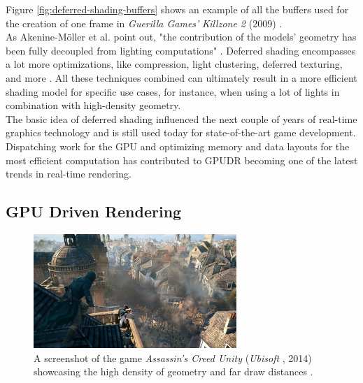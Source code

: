 \noindent
Figure \ref{fig:deferred-shading-buffers} shows an example of all the buffers used for the creation of one frame in 
\emph{Guerilla Games'} \emph{Killzone 2} (2009) \cite{KillzoneFandom}. \\

\noindent
As Akenine-Möller et al. point out, "the contribution of the models' geometry has been fully decoupled from lighting 
computations" \cite{AkenineMoeller2018}. Deferred shading encompasses a lot more optimizations, like compression, 
light clustering, deferred texturing, and more \cite{AkenineMoeller2018}. All these techniques combined can ultimately 
result in a more efficient shading model for specific use cases, for instance, when using a lot of lights in combination 
with high-density geometry. \\

\noindent
The basic idea of deferred shading influenced the next couple of years of real-time graphics technology and is 
still used today for state-of-the-art game development. Dispatching work for the \ac{GPU} and optimizing memory and 
data layouts for the most efficient computation has contributed to \ac{GPUDR} becoming one of the latest trends in real-time 
rendering.


\subsection*{GPU Driven Rendering}

\begin{figure}[h]
    \centering
    \includegraphics[width=290px]{images/graphics/assassins-creed-unity-gameplay.jpg}
    \caption{A screenshot of the game \emph{Assassin's Creed Unity} (\emph{Ubisoft} \cite{Ubisoft2014}, 2014) 
    showcasing the high density of geometry and far draw distances \cite{Burke2014}.}
    \label{fig:assassins-creed-unity-gameplay}
\end{figure}

